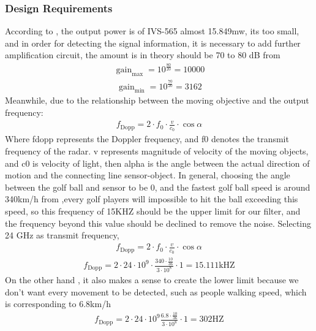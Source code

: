 \subsubsection{Design Requirements}
According to \textcite{IVS-565}, the output power is of IVS-565 almost 15.849mw, its too small, and in order for detecting the signal information, it is necessary to add further amplification circuit, the amount is in theory should be 70 to 80 dB from \textcite{Application_Note_I}
\begin{align}
\operatorname{gain}_{\max }=10^{\frac{80}{20}}=10000    
\end{align}
\begin{align}
\operatorname{gain}_{\min}=10^{\frac{70}{20}}=3162    
\end{align}
Meanwhile, due to the relationship between the moving objective and the output frequency:
\begin{align}
f_{\text {Dopp}}=2\cdot f_{0}\cdot\frac{v}{c_{0}}\cdot\cos \alpha
\end{align}
Where fdopp represents the Doppler frequency, and  f0 denotes the transmit frequency of the radar. v represents magnitude of velocity of the moving objects, and c0 is velocity of light, then alpha is the angle between the actual direction of motion and the connecting line sensor-object.
In general, choosing the angle between the golf ball and sensor to be 0, and the fastest golf ball speed is around 340km/h from \textcite{kobayashi1988golf},every golf players will impossible to hit the ball exceeding this speed, so this frequency of 15KHZ should be the upper limit for our filter, and the frequency beyond this value should be declined to remove the noise. Selecting 24 GHz as transmit frequency\textcite{Application_Note_I},
\begin{align}
f_{\text {Dopp}}=2\cdot f_{0}\cdot\frac{v}{c_{0}}\cdot\cos \alpha_{ }
\end{align}
\begin{align}
f_{\text {Dopp}}=2\cdot24\cdot10^{9} \cdot\frac{340\cdot \frac{10}{36}}{3\cdot10^{8}}\cdot1=15.111 \mathrm{kHZ}
\end{align}
 On the other hand , it also makes a sense to create the lower limit because we don’t want every movement to be detected, such as people walking speed, which is corresponding to 6.8km/h
 \begin{align}
f_{\text {Dopp}}=2\cdot24\cdot10^{9} \frac{6.8\cdot \frac{10}{36}}{3\cdot10^{8}}\cdot1=302 \mathrm{HZ}
\end{align}
